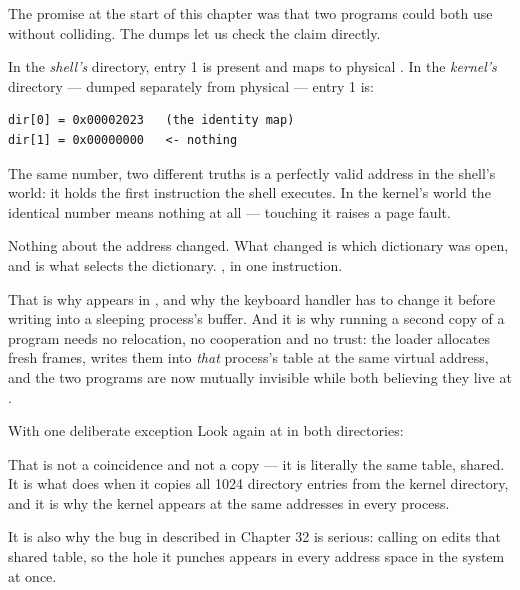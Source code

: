 The promise at the start of this chapter was that two programs could both use  without
colliding. The dumps let us check the claim directly.

In the \emph{shell's} directory, entry 1 is present and maps  to physical
. In the \emph{kernel's} directory --- dumped separately from physical  ---
entry 1 is:

\begin{lstlisting}[style=txt]
dir[0] = 0x00002023   (the identity map)
dir[1] = 0x00000000   <- nothing
\end{lstlisting}

\begin{concept}{The same number, two different truths}
 is a perfectly valid address in the shell's world: it holds the first instruction the
shell executes. In the kernel's world the identical number means nothing at all --- touching it
raises a page fault.

Nothing about the address changed. What changed is which dictionary was open, and  is what
selects the dictionary. , in one instruction.

That is why  appears in , and why the keyboard handler has to
change it before writing into a sleeping process's buffer. And it is why running a second copy of a
program needs no relocation, no cooperation and no trust: the loader allocates fresh frames, writes
them into \emph{that} process's table at the same virtual address, and the two programs are now
mutually invisible while both believing they live at .
\end{concept}

\begin{warn}{With one deliberate exception}
Look again at  in both directories: 

That is not a coincidence and not a copy --- it is literally the same table, shared. It is what
 does when it copies all 1024 directory entries from the kernel directory, and
it is why the kernel appears at the same addresses in every process.

It is also why the bug in  described in Chapter 32 is serious: calling
 on  edits that shared table, so the hole it punches appears
in every address space in the system at once.
\end{warn}

